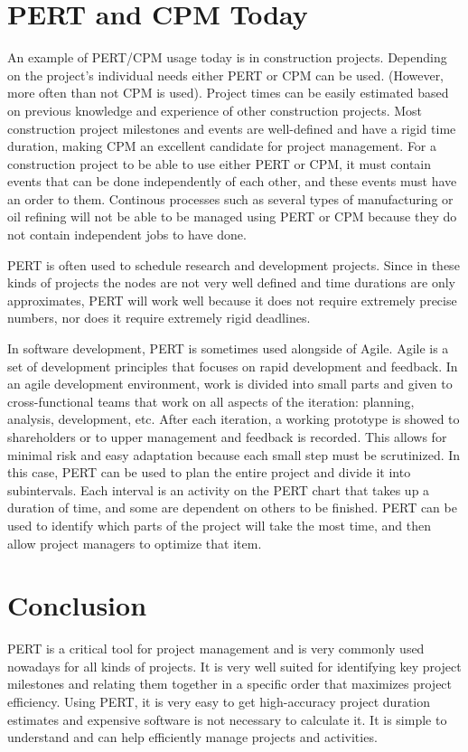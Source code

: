 \documentclass[12pt]{article}
\begin{document}
\section{PERT and CPM Today}
An example of PERT/CPM usage today is in construction projects.
Depending on the project's individual needs either PERT or CPM can be used.
(However, more often than not CPM is used).
Project times can be easily estimated based on previous knowledge and experience of other construction projects.
Most construction project milestones and events are well-defined and have a rigid time duration, making CPM an excellent candidate for project management.
For a construction project to be able to use either PERT or CPM, it must contain events that can be done independently of each other, and these events must have an order to them.
Continous processes such as several types of manufacturing or oil refining will not be able to be managed using PERT or CPM because they do not contain independent jobs to have done.

PERT is often used to schedule research and development projects.  Since in these kinds of projects the nodes are not very well defined and time durations are only approximates, PERT will work well because it does not require extremely precise numbers, nor does it require extremely rigid deadlines.

In software development, PERT is sometimes used alongside of Agile.  Agile is a set of development principles that focuses on rapid development and feedback.  In an agile development environment, work is divided into small parts and given to cross-functional teams that work on all aspects of the iteration: planning, analysis, development, etc.  After each iteration, a working prototype is showed to shareholders or to upper management and feedback is recorded.  This allows for minimal risk and easy adaptation because each small step must be scrutinized.  In this case, PERT can be used to plan the entire project and divide it into subintervals.  Each interval is an activity on the PERT chart that takes up a duration of time, and some are dependent on others to be finished.
PERT can be used to identify which parts of the project will take the most time, and then allow project managers to optimize that item.
\section{Conclusion}
PERT is a critical tool for project management and is very commonly used nowadays for all kinds of projects.
It is very well suited for identifying key project milestones and relating them together in a specific order that maximizes project efficiency.  Using PERT, it is very easy to get high-accuracy project duration estimates and expensive software is not necessary to calculate it.  It is simple to understand and can help efficiently manage projects and activities.  
\end{document}
